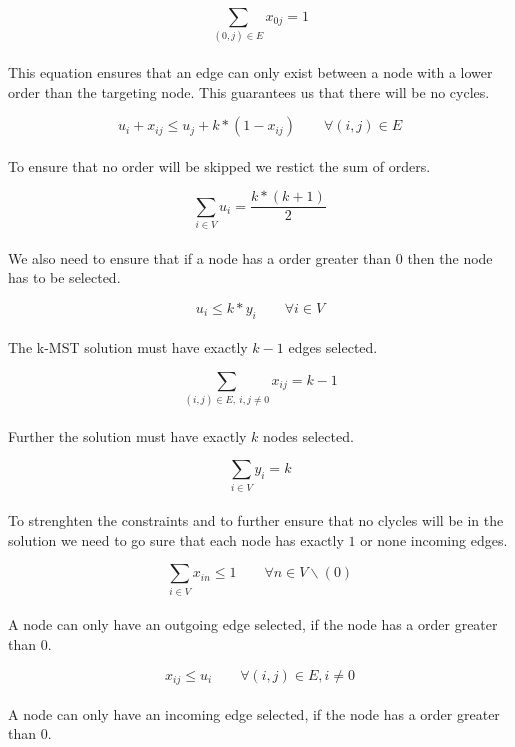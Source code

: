 \begin{equation}
  \sum_{(0,j) \in E} x_{0j} = 1 
\end{equation}
\\
This equation ensures that an edge can only exist between a node with a lower order than the targeting node. This guarantees us that there will be no cycles.

\begin{equation}
  u_{i} + x_{ij} \leq u_{j} + k*(1- x_{ij}) \qquad \forall (i,j) \in E 
\end{equation}
\\
To ensure that no order will be skipped we restict the sum of orders.

\begin{equation}
  \sum_{i \in V} u_i = \frac{k*(k+1)}{2} 
\end{equation}
\\
We also need to ensure that if a node has a order greater than $0$ then the node has to be selected.

\begin{equation}
  u_i \leq k*y_i \qquad \forall i \in V
\end{equation}
\\
The k-MST solution must have exactly $k-1$ edges selected.

\begin{equation}
  \sum_{(i,j) \in E, \ i,j \not =  0} x_{ij} = k-1 
\end{equation}
\\
Further the solution must have exactly $k$ nodes selected.

\begin{equation}
  \sum_{i \in V} y_i = k
\end{equation}
\\
To strenghten the constraints and to further ensure that no clycles will be in the solution we need to go sure that each node has exactly $1$ or none incoming edges.

\begin{equation}
  \sum_{i \in V} {x_{in}} \leq 1 \qquad \forall n \in V \backslash (0)
\end{equation}
\\
A node can only have an outgoing edge selected, if the node has a order greater than $0$.

\begin{equation}
  x_{ij} \leq u_i \qquad \forall (i,j) \in E, i \neq 0
\end{equation}
\\
A node can only have an incoming edge selected, if the node has a order greater than $0$.

